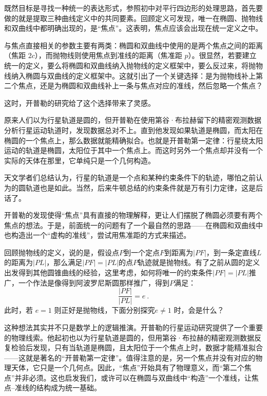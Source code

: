 既然目标是寻找一种统一的表达形式，参照初中对平行四边形的处理思路，首先要做的就是提取三种曲线定义中的共同要素。回顾定义可发现，唯一在椭圆、抛物线和双曲线中都明确出现的，是“焦点”。这表明，焦点应该会出现在统一定义之中。

与焦点直接相关的参数主要有两类：椭圆和双曲线中使用的是两个焦点之间的距离（焦距 $2c$），而抛物线则使用焦点到准线的距离（焦准距 $p$）。很显然，若要建立统一的定义，要么将椭圆和双曲线纳入抛物线的定义框架中，要么反过来，将抛物线纳入椭圆与双曲线的定义框架中。这就引出了一个关键选择：是为抛物线补上第二个焦点，还是为椭圆和双曲线补上一条与焦点对应的准线，然后忽略一个焦点？

这时，开普勒的研究给了这个选择带来了灵感。



原来人们以为行星轨道是圆的，但开普勒在使用第谷·布拉赫留下的精密观测数据分析行星运动轨道时，发现数据总对不上。直到他发现如果轨道是椭圆，而太阳在椭圆的一个焦点上，那么数据就能精确拟合。也就是开普勒第一定律：行星绕太阳运动的轨道是椭圆，太阳位于其中一个焦点上。而这时另外一个焦点却并没有一个实际的天体在那里，它单纯只是一个几何构造。

天文学者们总结认为，行星的轨道是一个点和某种约束条件下的轨迹，哪怕之前认为的圆轨道也是如此。当然，后来牛顿总结的约束条件就是万有引力定律，这是后话了。

开普勒的发现使得“焦点”具有直接的物理解释，更让人们摆脱了椭圆必须要有两个焦点的想法。于是，前面统一的问题有了一个最自然的思路——在椭圆和双曲线中也构造出一个“虚构的准线”，尝试用焦准距的方式来描述。

回顾抛物线的定义，说的是，假设点$P$到一个定点$F$到距离为$|PF|$，到一条定直线$L$的距离为$|PL|$，那么满足$|PF|=|PL|$的点$P$轨迹就是抛物线。有了之前从圆的定义出发得到其他圆锥曲线的经验，这里考虑，如何将唯一的约束条件$|PF|=|PL|$推广，一个作法是像得到阿波罗尼斯圆那样推广，得到$P$满足：
\begin{equation}\label{eq_HsCsFD_1}
\frac{|PF|}{|PL|} = e~.
\end{equation}
此时，若 $e = 1$ 则正好是抛物线，下面分别探究$e \ne 1$ 时，会是什么？



这种想法其实并不只是数学上的逻辑推演。开普勒的行星运动研究提供了一个重要的物理线索。他起初也以为行星轨道是圆的，但用第谷·布拉赫的精密观测数据反复检验后发现，只有当轨道是椭圆，且太阳位于一个焦点上时，数据才能精准拟合——这就是著名的“开普勒第一定律”。值得注意的是，另一个焦点并没有对应的物理天体，它只是一个几何点。因此，“焦点”开始具有了物理意义，而“第二个焦点”并非必须。这也启发我们，或许可以在椭圆与双曲线中“构造”一个准线，让焦点–准线的结构成为统一基础。

